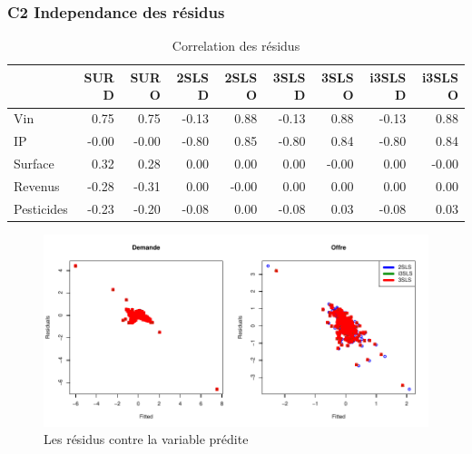 \documentclass[11pt,]{article}
\begin{document}
\FloatBarrier

\newpage

\hypertarget{c2-independance-des-residus}{%
\subsubsection{C2 Independance des
résidus}\label{c2-independance-des-residus}}

\FloatBarrier

\begin{table}[ht]
\centering
\begin{tabular}{l|rrrrrrrr}
  \hline
 & SUR D & SUR O & 2SLS D & 2SLS O & 3SLS D & 3SLS O & i3SLS D & i3SLS O \\ 
  \hline
Vin & 0.75 & 0.75 & -0.13 & 0.88 & -0.13 & 0.88 & -0.13 & 0.88 \\ 
  IP & -0.00 & -0.00 & -0.80 & 0.85 & -0.80 & 0.84 & -0.80 & 0.84 \\ 
  Surface & 0.32 & 0.28 & 0.00 & 0.00 & 0.00 & -0.00 & 0.00 & -0.00 \\ 
  Revenus & -0.28 & -0.31 & 0.00 & -0.00 & 0.00 & 0.00 & 0.00 & 0.00 \\ 
  Pesticides & -0.23 & -0.20 & -0.08 & 0.00 & -0.08 & 0.03 & -0.08 & 0.03 \\ 
   \hline
\end{tabular}
\caption{Correlation des résidus} 
\end{table}

\FloatBarrier

\FloatBarrier

\begin{figure}[!htbp]

{\centering \includegraphics{note2pres_files/figure-latex/unnamed-chunk-73-1} 

}

\caption{Les résidus contre la variable prédite}\label{fig:unnamed-chunk-73}
\end{figure}
\end{document}
